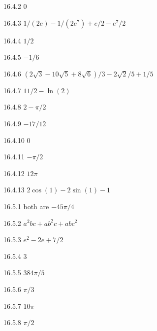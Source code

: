 \begin{Answer}{16.4.2}
	$0$
\end{Answer}
\begin{Answer}{16.4.3}
	$1/(2e)-1/(2e^7)+e/2-e^7/2$
\end{Answer}
\begin{Answer}{16.4.4}
	$1/2$
\end{Answer}
\begin{Answer}{16.4.5}
	$-1/6$
\end{Answer}
\begin{Answer}{16.4.6}
	$(2\sqrt3-10\sqrt5+8\sqrt6)/3-2\sqrt2/5+1/5$
\end{Answer}
\begin{Answer}{16.4.7}
	$11/2-\ln(2)$
\end{Answer}
\begin{Answer}{16.4.8}
	$2-\pi/2$
\end{Answer}
\begin{Answer}{16.4.9}
	$-17/12$
\end{Answer}
\begin{Answer}{16.4.10}
	$0$
\end{Answer}
\begin{Answer}{16.4.11}
	$-\pi/2$
\end{Answer}
\begin{Answer}{16.4.12}
	$12\pi$
\end{Answer}
\begin{Answer}{16.4.13}
	$2\cos(1)-2\sin(1)-1$
\end{Answer}
\begin{Answer}{16.5.1}
	both are $-45\pi/4$
\end{Answer}
\begin{Answer}{16.5.2}
	$a^2bc+ab^2c+abc^2$
\end{Answer}
\begin{Answer}{16.5.3}
	$e^2-2e+7/2$
\end{Answer}
\begin{Answer}{16.5.4}
	$3$
\end{Answer}
\begin{Answer}{16.5.5}
	$384\pi/5$
\end{Answer}
\begin{Answer}{16.5.6}
	$\pi/3$
\end{Answer}
\begin{Answer}{16.5.7}
	$10\pi$
\end{Answer}
\begin{Answer}{16.5.8}
	$\pi/2$
\end{Answer}
